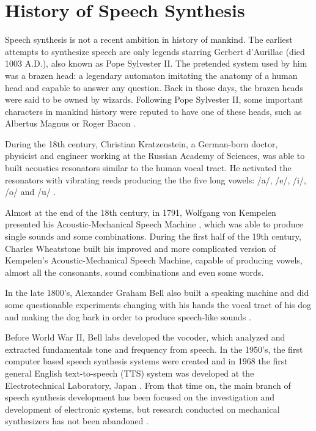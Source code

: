 \section{History of Speech Synthesis}
\label{history_speech_synthesis}
Speech synthesis is not a recent ambition in history of mankind. The earliest attempts to synthesize speech are only legends starring Gerbert d'Aurillac (died 1003 A.D.), also known as Pope Sylvester II. The pretended system used by him was a brazen head: a legendary automaton imitating the anatomy of a human head and capable to answer any question. Back in those days, the brazen heads were said to be owned by wizards. Following Pope Sylvester II, some important characters in mankind history  were reputed to have one of these heads, such as Albertus Magnus or Roger Bacon \cite{butler1993myth}.

During the 18th century, Christian Kratzenstein, a German-born doctor, physicist and engineer working at the Russian Academy of Sciences, was able to built acoustics resonators similar to the human vocal tract. He activated the resonators with vibrating reeds producing the the five long vowels: /a/, /e/, /i/, /o/ and /u/ \cite{LemmettyMSc}.

Almost at the end of the 18th century, in 1791, Wolfgang von Kempelen presented his Acoustic-Mechanical Speech Machine \cite{vonKempelen}, which was able to produce single sounds and some combinations. During the first half of the 19th century, Charles Wheatstone built his improved and more complicated version of Kempelen's Acoustic-Mechanical Speech Machine, capable of producing vowels, almost all the consonants, sound combinations and even some words.	

In the late 1800's, Alexander Graham Bell also built a speaking machine and did some questionable experiments changing with his hands the vocal tract of his dog and making the dog bark in order to produce speech-like sounds \cite{Schroeder93, LemmettyMSc}.

Before World War II, Bell labs developed the vocoder, which analyzed and extracted fundamentals tone and frequency from speech. In the 1950's, the first computer based speech synthesis systems were created and in 1968 the first general English text-to-speech (TTS) system was developed at the Electrotechnical Laboratory, Japan \cite{Klatt87}. From that time on, the main branch of speech synthesis development has been focused on the investigation and development of electronic systems, but research conducted on mechanical synthesizers has not been abandoned \cite{mechSynthWeb, mechSynth}.

